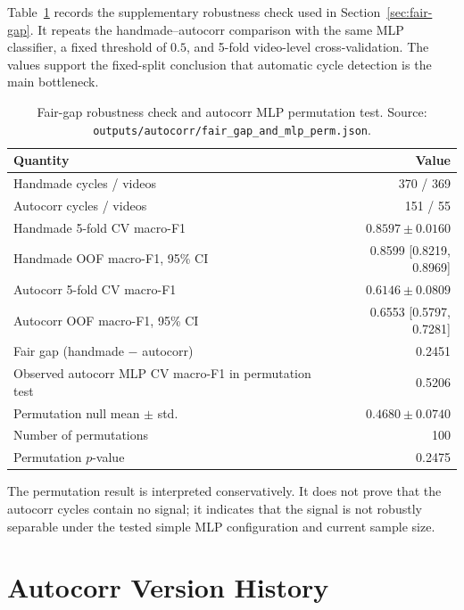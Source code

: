 Table~\ref{tab:app-fair-gap} records the supplementary robustness check used in
Section~\ref{sec:fair-gap}. It repeats the handmade--autocorr comparison with
the same MLP classifier, a fixed threshold of $0.5$, and 5-fold video-level
cross-validation. The values support the fixed-split conclusion that automatic
cycle detection is the main bottleneck.

\begin{table}[htbp]
\centering
\caption{Fair-gap robustness check and autocorr MLP permutation test. Source: \texttt{outputs/autocorr/fair\_gap\_and\_mlp\_perm.json}.}
\label{tab:app-fair-gap}
\renewcommand{\arraystretch}{1.18}
\scriptsize
\begin{tabularx}{\textwidth}{X r}
\toprule
\textbf{Quantity} & \textbf{Value} \\
\midrule
Handmade cycles / videos & 370 / 369 \\
Autocorr cycles / videos & 151 / 55 \\
Handmade 5-fold CV macro-F1 & $0.8597 \pm 0.0160$ \\
Handmade OOF macro-F1, 95\% CI & 0.8599 [0.8219, 0.8969] \\
Autocorr 5-fold CV macro-F1 & $0.6146 \pm 0.0809$ \\
Autocorr OOF macro-F1, 95\% CI & 0.6553 [0.5797, 0.7281] \\
Fair gap (handmade $-$ autocorr) & 0.2451 \\
Observed autocorr MLP CV macro-F1 in permutation test & 0.5206 \\
Permutation null mean $\pm$ std. & $0.4680 \pm 0.0740$ \\
Number of permutations & 100 \\
Permutation $p$-value & 0.2475 \\
\bottomrule
\end{tabularx}
\end{table}

The permutation result is interpreted conservatively. It does not prove that the
autocorr cycles contain no signal; it indicates that the signal is not robustly
separable under the tested simple MLP configuration and current sample size.


\section{Autocorr Version History}
\label{app:version-history}

